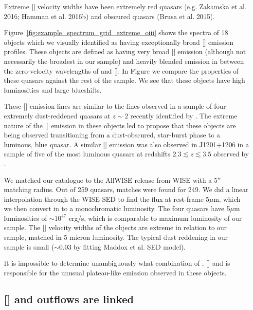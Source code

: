 Extreme [] velocity widths have been extremely red quasars (e.g. Zakamska et al. 2016; Hamman et al. 2016b) and obscured quasars (Brusa et al. 2015). 

Figure~\ref{fig:example_spectrum_grid_extreme_oiii} shows the spectra of 18 objects which we visually identified as having exceptionally broad [] emission profiles. 
These objects are defined as having very broad [] emission (although not necessarily the broadest in our sample) and heavily blended emission in between the zero-velocity wavelengths of \hb and []. 
In Figure we compare the properties of these quasars against the rest of the sample. 
We see that these objects have high luminosities and large  blueshifts. 

These [] emission lines are similar to the lines observed in a sample of four extremely dust-reddened quasars at $z\sim2$ recently identified by \citet{zakamska16}. 
The extreme nature of the [] emission in these objects led \citet{zakamska16} to propose that these objects are being observed transitioning from a dust-obscured, star-burst phase to a luminous, blue quasar. 
A similar [] emission was also observed in J1201+1206 in a sample of five of the most luminous quasars at redshifts $2.3 \lesssim z \lesssim 3.5$ observed by \citet{bischetti16}.

We matched our catalogue to the AllWISE release from WISE with a 5$''$ matching radius. 
Out of 259 quasars, matches were found for 249. 
We did a linear interpolation through the WISE SED to find the flux at rest-frame 5$\mu$m, which we then convert in to a monochromatic luminosity. 
The four \citet{zakamska16} quasars have 5$\mu$m luminosities of $\sim10^{47}$ erg/s, which is comparable to maximum luminosity of our sample.
The [] velocity widths of the \citet{zakamska16} objects are extreme in relation to our sample, matched in 5 micron luminosity. 
The typical dust reddening in our sample is small ($\sim$0.03 by fitting Maddox et al. SED model). 

It is impossible to determine unambiguously what combination of \hb, [] and  is responsible for the unusual plateau-like emission observed in these objects. 

\subsection{[] and  outflows are linked}

